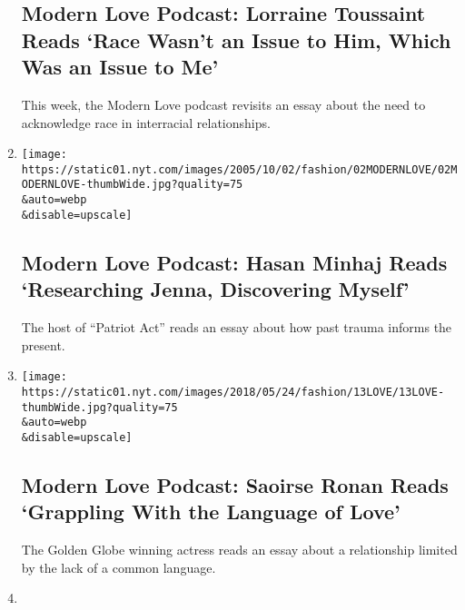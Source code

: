 \begin{enumerate}
  \hypertarget{modern-love-podcast-lorraine-toussaint-reads-race-wasnt-an-issue-to-him-which-was-an-issue-to-me}{%
  \subsection{Modern Love Podcast: Lorraine Toussaint Reads `Race Wasn't
  an Issue to Him, Which Was an Issue to
  Me'}\label{modern-love-podcast-lorraine-toussaint-reads-race-wasnt-an-issue-to-him-which-was-an-issue-to-me}}

  This week, the Modern Love podcast revisits an essay about the need to
  acknowledge race in interracial relationships.
\item
  \href{/2020/06/03/style/modern-love-podcast-hasan-minhaj.html}{}

  \texttt{[image: https://static01.nyt.com/images/2005/10/02/fashion/02MODERNLOVE/02MODERNLOVE-thumbWide.jpg?quality=75\\\&auto=webp\\\&disable=upscale]}

  \hypertarget{modern-love-podcast-hasan-minhaj-reads-researching-jenna-discovering-myself}{%
  \subsection{Modern Love Podcast: Hasan Minhaj Reads `Researching
  Jenna, Discovering
  Myself'}\label{modern-love-podcast-hasan-minhaj-reads-researching-jenna-discovering-myself}}

  The host of ``Patriot Act'' reads an essay about how past trauma
  informs the present.
\item
  \href{/2020/05/27/style/modern-love-podcast-saoirse-ronan.html}{}

  \texttt{[image: https://static01.nyt.com/images/2018/05/24/fashion/13LOVE/13LOVE-thumbWide.jpg?quality=75\\\&auto=webp\\\&disable=upscale]}

  \hypertarget{modern-love-podcast-saoirse-ronan-reads-grappling-with-the-language-of-love}{%
  \subsection{Modern Love Podcast: Saoirse Ronan Reads `Grappling With
  the Language of
  Love'}\label{modern-love-podcast-saoirse-ronan-reads-grappling-with-the-language-of-love}}

  The Golden Globe winning actress reads an essay about a relationship
  limited by the lack of a common language.
\item
  \href{/2020/05/20/style/modern-love-podcast-jameela-jamil.html}{}


\end{enumerate}
